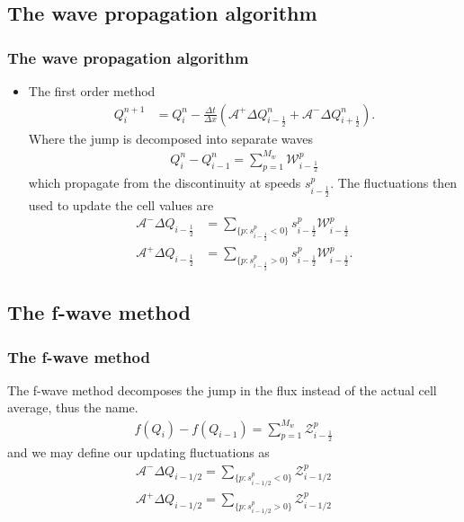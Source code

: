 \documentclass{beamer}
\begin{document}
\subsection{The wave propagation algorithm}
\frame
{
  \frametitle{The  wave propagation algorithm}
  \begin{itemize}
  \item<1-> The first order method
  \begin{align*}
Q_i^{n+1}&=Q_i^n-\frac{\Delta t}{\Delta x} (\mathcal{A}^+\Delta Q_{i-\frac{1}{2}}^n+\mathcal{A}^-\Delta Q_{i+\frac{1}{2}}^n).
\end{align*}
Where the jump is decomposed into separate waves
\begin{align*}
Q_i^n-Q_{i-1}^n=\sum_{p=1}^{M_w} \mathcal{W}_{i-\frac{1}{2}}^p
\end{align*}
which propagate from the discontinuity at speeds $s_{i-\frac{1}{2}}^p$.  The fluctuations then used to update the cell values are
\begin{align*}
\mathcal{A}^- \Delta Q_{i-\frac{1}{2}}&=\sum_{\lbrace p:s^p_{i-\frac{1}{2}}<0\rbrace} s_{i-\frac{1}{2}}^p \mathcal{W}_{i-\frac{1}{2}}^p\\
\mathcal{A}^+\Delta Q_{i-\frac{1}{2}}&=\sum_{\lbrace p: s_{i-\frac{1}{2}}^p>0\rbrace} s_{i-\frac{1}{2}}^p \mathcal{W}_{i-\frac{1}{2}}^p.
\end{align*}
  \end{itemize}
}

\subsection{The f-wave method}
\frame
{
\frametitle{The f-wave method}
The f-wave method decomposes the jump in the flux instead of the actual cell average, thus the name.
\begin{align*}
f(Q_i)-f(Q_{i-1})=\sum_{p=1}^{M_w} \mathcal{Z}_{i-\frac{1}{2}}^p
\end{align*}
and we may define our updating fluctuations as
\begin{align*}
\label{fwave fluc}
\mathcal{A}^- \Delta Q_{i-1/2}=\sum_{\{p:s_{i-1/2}^p <0\}} \mathcal{Z}_{i-1/2}^p\\
\mathcal{A}^+ \Delta Q_{i-1/2}=\sum_{\{p:s_{i-1/2}^p >0\}} \mathcal{Z}_{i-1/2}^p
\end{align*}
}
\end{document}

